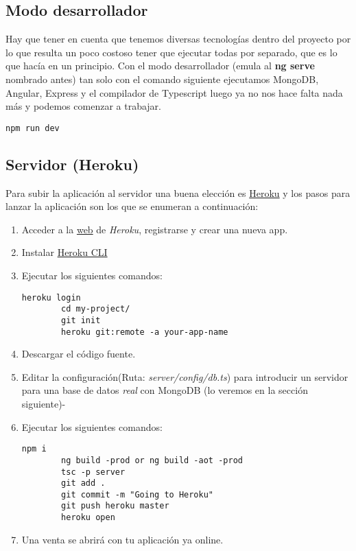 \subsection{Modo desarrollador}

Hay que tener en cuenta que tenemos diversas tecnologías dentro del proyecto por lo que resulta un poco costoso tener que ejecutar todas por separado, que es lo que hacía en un principio. Con el modo desarrollador (emula al \textbf{ng serve} nombrado antes) tan solo con el comando siguiente ejecutamos MongoDB, Angular, Express y el compilador de Typescript luego ya no nos hace falta nada más y podemos comenzar a trabajar. 

	\lstset{language=C, breaklines=true, basicstyle=\footnotesize}
		\begin{lstlisting}[frame=single]
		npm run dev
    	\end{lstlisting}

\subsection{Servidor (Heroku)}
Para subir la aplicación al servidor una buena elección es \href{https://www.heroku.com/}{Heroku} y los pasos para lanzar la aplicación son los que se enumeran a continuación:

\begin{enumerate}
	\item Acceder a la \href{https://www.heroku.com/}{web} de \emph{Heroku}, registrarse y crear una nueva app.
	\item Instalar \href{https://devcenter.heroku.com/articles/heroku-cli}{Heroku CLI}
	\item Ejecutar los siguientes comandos:
		\lstset{language=C, breaklines=true, basicstyle=\footnotesize}
		\begin{lstlisting}[frame=single]
		heroku login
		cd my-project/
		git init
		heroku git:remote -a your-app-name
    	\end{lstlisting}
	\item Descargar el código fuente.
	\item Editar la configuración(Ruta: \emph{server/config/db.ts}) para introducir un servidor para una base de datos \emph{real} con MongoDB (lo veremos en la sección siguiente)-
	\item Ejecutar los siguientes comandos:
		\lstset{language=C, breaklines=true, basicstyle=\footnotesize}
		\begin{lstlisting}[frame=single]
		npm i
		ng build -prod or ng build -aot -prod
		tsc -p server
		git add .
		git commit -m "Going to Heroku"
		git push heroku master
		heroku open
    	\end{lstlisting}
	\item Una venta se abrirá con tu aplicación ya online.
\end{enumerate}

